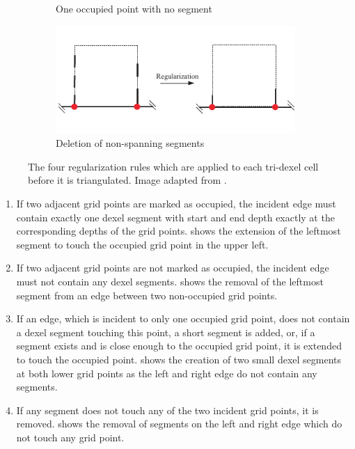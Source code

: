 \begin{figure}[h]
\begin{subfigure}[t]{0.45\textwidth}
		\caption{One occupied point with no segment}
		\label{fig:tri_dexel_regularization_3}
	\end{subfigure}
	\begin{subfigure}[t]{0.45\textwidth}
		\centering
		\includegraphics[width=\textwidth]{images/tri_dexel_regularization_4}
		\caption{Deletion of non-spanning segments}
		\label{fig:tri_dexel_regularization_4}
	\end{subfigure}
	\caption[Regularization rules]{
		The four regularization rules which are applied to each tri-dexel cell before it is triangulated.
		Image adapted from \cite{tridexel_reconstruction}.
	}
	\label{fig:tri_dexel_regularization}
\end{figure}

\begin{enumerate}
	\item If two adjacent grid points are marked as occupied, the incident edge must contain exactly one dexel segment with start and end depth exactly at the corresponding depths of the grid points.
	 shows the extension of the leftmost segment to touch the occupied grid point in the upper left.

	\item If two adjacent grid points are not marked as occupied, the incident edge must not contain any dexel segments.
	 shows the removal of the leftmost segment from an edge between two non-occupied grid points.

	\item If an edge, which is incident to only one occupied grid point, does not contain a dexel segment touching this point, a short segment is added, or, if a segment exists and is close enough to the occupied grid point, it is extended to touch the occupied point.
	 shows the creation of two small dexel segments at both lower grid points as the left and right edge do not contain any segments.

	\item If any segment does not touch any of the two incident grid points, it is removed.
	 shows the removal of segments on the left and right edge which do not touch any grid point.
\end{enumerate}

